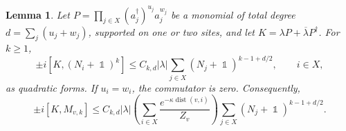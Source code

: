 \documentclass[11pt]{article}
\theoremstyle{myplain}
\newtheorem{lem}[lem]{Lemma}
\theoremstyle{mydefinition}
\theoremstyle{remark}
\DeclareMathOperator{\dist}{dist}
\DeclareMathOperator{\1}{\mathds{1}}
\begin{document}
        \begin{lem}\label{appx-lem:polynomial-commutator-form}
            Let $P=\prod_{j\in X}(a_j^\dagger)^{u_j}a_j^{w_j}$ be a monomial of total degree $d=\sum_j(u_j+w_j)$, supported on one or two sites, and let $K=\lambda P+\overline\lambda P^\dagger$. For $k\ge1$,
            \begin{equation}
                \pm i[K,(N_i+\1)^k]
                \le C_{k,d}|\lambda|\sum_{j\in X}(N_j+\1)^{k-1+d/2},
                \qquad i\in X,
            \end{equation}
            as quadratic forms. If $u_i=w_i$, the commutator is zero. Consequently,
            \begin{equation}\label{eq:weighted-polynomial-commutator}
                \pm i[K,M_{v,k}]
                \le C_{k,d}|\lambda|
                \left(\sum_{i\in X}\frac{e^{-\kappa\dist(v,i)}}{Z_v}\right)
                \sum_{j\in X}(N_j+\1)^{k-1+d/2}.
            \end{equation}
        \end{lem}
\end{document}

